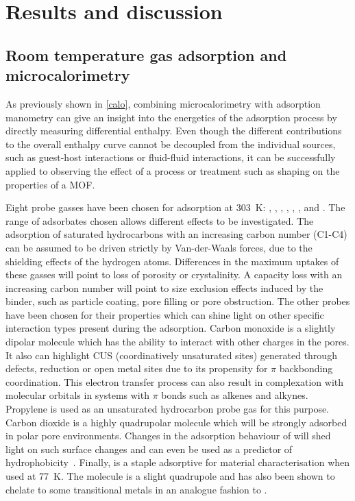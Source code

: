 
\section{Results and discussion}




\subsection{Room temperature gas adsorption and microcalorimetry}

As previously shown in \autoref{calo},
combining microcalorimetry with adsorption manometry
can give an insight into the energetics of the
adsorption process by directly measuring differential enthalpy.
Even though the different contributions to the overall enthalpy curve
cannot be decoupled from the individual sources, such as guest-host
interactions or fluid-fluid interactions, it can be successfully
applied to observing the effect of a process or treatment such as shaping
on the properties of a \gls{MOF}.

Eight probe gasses have been chosen for adsorption at \SI{303}{\kelvin}:
, , , , , ,
 and .
The range of adsorbates chosen allows different effects to be investigated.
The adsorption of saturated hydrocarbons with an increasing
carbon number (C1-C4) can be
assumed to be driven strictly by Van-der-Waals forces,
due to the shielding effects of the hydrogen atoms.
Differences in the maximum uptakes of these gasses will point to
loss of porosity or crystalinity. A capacity loss with
an increasing carbon number will point to size exclusion effects
induced by the binder, such as particle coating, pore filling or
pore obstruction.
The other probes have been chosen for their properties which can
shine light on other specific interaction types
present during the adsorption.
Carbon monoxide is a slightly dipolar molecule which has the
ability to interact with other charges in the pores.
It also can highlight \gls{CUS} (coordinatively unsaturated sites)
generated through defects, reduction or open metal sites due to its
propensity for \( \pi \) backbonding coordination.
This electron transfer process can also result in complexation with
molecular orbitals in systems with \( \pi \) bonds such as alkenes 
and alkynes.
Propylene is used as an unsaturated hydrocarbon probe gas for this purpose.
Carbon dioxide is a highly quadrupolar molecule which will be
strongly adsorbed in polar pore environments. Changes in the adsorption
behaviour of  will shed light on such surface changes and
can even be used as a predictor
of hydrophobicity~\cite{chanutScreeningEffectWater2017}.
Finally,  is a staple adsorptive for material characterisation
when used at \SI{77}{\kelvin}. The molecule is a slight quadrupole
and has also been shown to chelate to some transitional metals in
an analogue fashion to .

